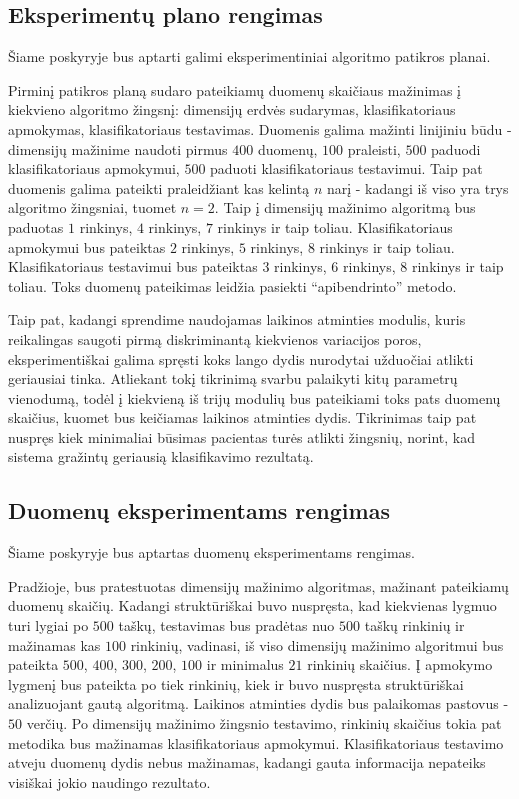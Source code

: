 \documentclass[]{vgtuef}
\begin{document}
\subsection{Eksperimentų plano rengimas}

Šiame poskyryje bus aptarti galimi eksperimentiniai algoritmo patikros planai.

Pirminį patikros planą sudaro pateikiamų duomenų skaičiaus mažinimas į kiekvieno algoritmo žingsnį: dimensijų erdvės sudarymas, klasifikatoriaus apmokymas, klasifikatoriaus testavimas. Duomenis galima mažinti linijiniu būdu - dimensijų mažinime naudoti pirmus $400$ duomenų, $100$ praleisti, $500$ paduodi klasifikatoriaus apmokymui, $500$ paduoti klasifikatoriaus testavimui. Taip pat duomenis galima pateikti praleidžiant kas kelintą $n$ narį - kadangi iš viso yra trys algoritmo žingsniai, tuomet $n=2$. Taip į dimensijų mažinimo algoritmą bus paduotas $1$ rinkinys, $4$ rinkinys, $7$ rinkinys ir taip toliau. Klasifikatoriaus apmokymui bus pateiktas $2$ rinkinys, $5$ rinkinys, $8$ rinkinys ir taip toliau. Klasifikatoriaus testavimui bus pateiktas $3$ rinkinys, $6$ rinkinys, $8$ rinkinys ir taip toliau. Toks duomenų pateikimas leidžia pasiekti ``apibendrinto'' metodo. 

Taip pat, kadangi sprendime naudojamas laikinos atminties modulis, kuris reikalingas saugoti pirmą diskriminantą kiekvienos variacijos poros, eksperimentiškai galima spręsti koks lango dydis nurodytai užduočiai atlikti geriausiai tinka. Atliekant tokį tikrinimą svarbu palaikyti kitų parametrų vienodumą, todėl į kiekvieną iš trijų modulių bus pateikiami toks pats duomenų skaičius, kuomet bus keičiamas laikinos atminties dydis. Tikrinimas taip pat nuspręs kiek minimaliai būsimas pacientas turės atlikti žingsnių, norint, kad sistema gražintų geriausią klasifikavimo rezultatą.

\subsection{Duomenų eksperimentams rengimas}

Šiame poskyryje bus aptartas duomenų eksperimentams rengimas. 

Pradžioje, bus pratestuotas dimensijų mažinimo algoritmas, mažinant pateikiamų duomenų skaičių. Kadangi struktūriškai buvo nuspręsta, kad kiekvienas lygmuo turi lygiai po $500$ taškų, testavimas bus pradėtas nuo $500$ taškų rinkinių ir mažinamas kas $100$ rinkinių, vadinasi, iš viso dimensijų mažinimo algoritmui bus pateikta $500$, $400$, $300$, $200$, $100$ ir minimalus $21$ rinkinių skaičius. Į apmokymo lygmenį bus pateikta po tiek rinkinių, kiek ir buvo nuspręsta struktūriškai analizuojant gautą algoritmą. Laikinos atminties dydis bus palaikomas pastovus - $50$ verčių. Po dimensijų mažinimo žingsnio testavimo, rinkinių skaičius tokia pat metodika bus mažinamas klasifikatoriaus apmokymui. Klasifikatoriaus testavimo atveju duomenų dydis nebus mažinamas, kadangi gauta informacija nepateiks visiškai jokio naudingo rezultato.
\end{document}
